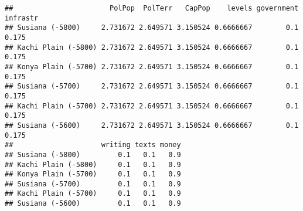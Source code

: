 \documentclass[
]{article}
\newenvironment{Shaded}{\begin{snugshade}}{\end{snugshade}}
\newcommand{\CommentTok}[1]{\textcolor[rgb]{0.56,0.35,0.01}{\textit{#1}}}
\newcommand{\DataTypeTok}[1]{\textcolor[rgb]{0.13,0.29,0.53}{#1}}
\newcommand{\DecValTok}[1]{\textcolor[rgb]{0.00,0.00,0.81}{#1}}
\newcommand{\KeywordTok}[1]{\textcolor[rgb]{0.13,0.29,0.53}{\textbf{#1}}}
\newcommand{\NormalTok}[1]{#1}
\newcommand{\OperatorTok}[1]{\textcolor[rgb]{0.81,0.36,0.00}{\textbf{#1}}}
\newcommand{\StringTok}[1]{\textcolor[rgb]{0.31,0.60,0.02}{#1}}
\begin{document}
\begin{Shaded}
\end{Shaded}

\begin{verbatim}
##                       PolPop  PolTerr   CapPop    levels government infrastr
## Susiana (-5800)     2.731672 2.649571 3.150524 0.6666667        0.1    0.175
## Kachi Plain (-5800) 2.731672 2.649571 3.150524 0.6666667        0.1    0.175
## Konya Plain (-5700) 2.731672 2.649571 3.150524 0.6666667        0.1    0.175
## Susiana (-5700)     2.731672 2.649571 3.150524 0.6666667        0.1    0.175
## Kachi Plain (-5700) 2.731672 2.649571 3.150524 0.6666667        0.1    0.175
## Susiana (-5600)     2.731672 2.649571 3.150524 0.6666667        0.1    0.175
##                     writing texts money
## Susiana (-5800)         0.1   0.1   0.9
## Kachi Plain (-5800)     0.1   0.1   0.9
## Konya Plain (-5700)     0.1   0.1   0.9
## Susiana (-5700)         0.1   0.1   0.9
## Kachi Plain (-5700)     0.1   0.1   0.9
## Susiana (-5600)         0.1   0.1   0.9
\end{verbatim}
\end{document}
